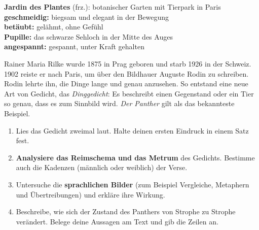 \documentclass[11pt,a4paper]{article}
\begin{document}
\begin{minipage}[t]{0.33\linewidth}\vspace{0pt}
\begin{tcolorbox}[colback=lesebuchhell, colframe=lesebuch, boxrule=0.5pt, arc=2pt, left=6pt, right=6pt,
  top=4pt, bottom=4pt, title={\sffamily\bfseries Worterklärungen}, fonttitle=\sffamily\small, coltitle=white,
  colbacktitle=lesebuch]
\sffamily\footnotesize
\textbf{Jardin des Plantes} (frz.): botanischer Garten mit Tierpark in Paris\\[0.2em]
\textbf{geschmeidig:} biegsam und elegant in der Bewegung\\[0.2em]
\textbf{betäubt:} gelähmt, ohne Gefühl\\[0.2em]
\textbf{Pupille:} das schwarze Sehloch in der Mitte des Auges\\[0.2em]
\textbf{angespannt:} gespannt, unter Kraft gehalten
\end{tcolorbox}

\vspace{0.3em}
\begin{tcolorbox}[colback=white, colframe=lesebuch, boxrule=0.5pt, arc=2pt, left=6pt, right=6pt,
  top=4pt, bottom=4pt, title={\sffamily\bfseries Zum Autor}, fonttitle=\sffamily\small, coltitle=white,
  colbacktitle=lesebuch]
\sffamily\footnotesize
Rainer Maria Rilke wurde 1875 in Prag geboren und starb 1926 in der Schweiz. 1902 reiste er nach Paris, um
über den Bildhauer Auguste Rodin zu schreiben. Rodin lehrte ihn, die Dinge lange und genau anzusehen. So
entstand eine neue Art von Gedicht, das \emph{Dinggedicht}: Es beschreibt einen Gegenstand oder ein Tier
so genau, dass es zum Sinnbild wird. \emph{Der Panther} gilt als das bekannteste Beispiel.
\end{tcolorbox}
\end{minipage}

\vspace{1.2em}
\begin{tcolorbox}[colback=white, colframe=lesebuch, boxrule=1.2pt, arc=3pt, left=10pt, right=10pt, top=6pt, bottom=6pt,
  title={\sffamily\bfseries Arbeitsauftrag \hfill\normalfont\small Bearbeitungszeit: 25 Minuten}, fonttitle=\sffamily\large,
  coltitle=white, colbacktitle=lesebuch]
\begin{enumerate}[leftmargin=1.6em, itemsep=0.35em, label=\textbf{\arabic*.}]
  \item Lies das Gedicht zweimal laut. Halte deinen ersten Eindruck in einem Satz fest.
  \item \textbf{Analysiere das Reimschema und das Metrum} des Gedichts. Bestimme auch die Kadenzen
        (männlich oder weiblich) der Verse.
  \item Untersuche die \textbf{sprachlichen Bilder} (zum Beispiel Vergleiche, Metaphern und
        Übertreibungen) und erkläre ihre Wirkung.
  \item Beschreibe, wie sich der Zustand des Panthers von Strophe zu Strophe verändert. Belege deine Aussagen am
        Text und gib die Zeilen an.
\end{enumerate}
\end{tcolorbox}
\end{document}
